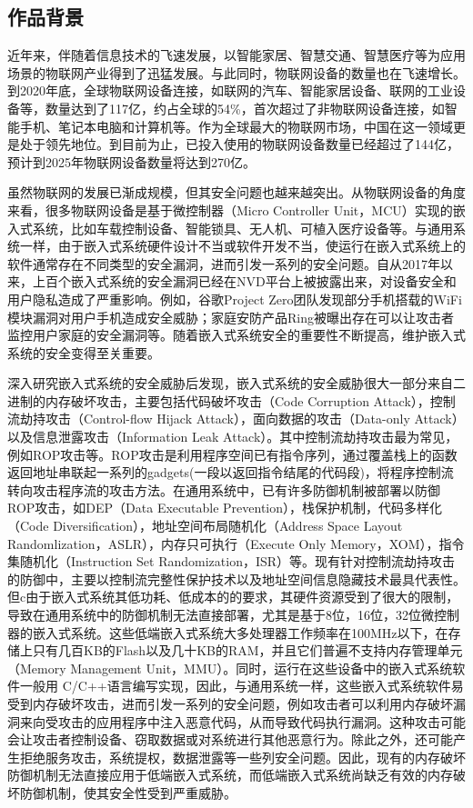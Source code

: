 \documentclass[UTF8,12pt,a4paper]{ctexart}
\numberwithin{figure}{section}
\begin{document}
\subsection{作品背景}
\par 近年来，伴随着信息技术的飞速发展，以智能家居、智慧交通、智慧医疗等为应用场景的物联网产业得到了迅猛发展。与此同时，物联网设备的数量也在飞速增长。到2020年底，全球物联网设备连接，如联网的汽车、智能家居设备、联网的工业设备等，数量达到了117亿，约占全球的54\%，首次超过了非物联网设备连接，如智能手机、笔记本电脑和计算机等。作为全球最大的物联网市场，中国在这一领域更是处于领先地位。到目前为止，已投入使用的物联网设备数量已经超过了144亿，预计到2025年物联网设备数量将达到270亿\cite{StateOfIOT}。
\par 虽然物联网的发展已渐成规模，但其安全问题也越来越突出。从物联网设备的角度来看，很多物联网设备是基于微控制器（Micro Controller Unit，MCU）实现的嵌入式系统，比如车载控制设备、智能锁具、无人机、可植入医疗设备等。与通用系统一样，由于嵌入式系统硬件设计不当或软件开发不当，使运行在嵌入式系统上的软件通常存在不同类型的安全漏洞，进而引发一系列的安全问题。自从2017年以来，上百个嵌入式系统的安全漏洞已经在NVD平台上被披露出来，对设备安全和用户隐私造成了严重影响。例如，谷歌Project Zero团队发现部分手机搭载的WiFi模块漏洞对用户手机造成安全威胁\cite{beniamini2017project}；家庭安防产品Ring被曝出存在可以让攻击者监控用户家庭的安全漏洞等\cite{Amazon}。随着嵌入式系统安全的重要性不断提高，维护嵌入式系统的安全变得至关重要。
\par 深入研究嵌入式系统的安全威胁后发现，嵌入式系统的安全威胁很大一部分来自二进制的内存破坏攻击，主要包括代码破坏攻击（Code Corruption Attack），控制流劫持攻击（Control-flow Hijack Attack），面向数据的攻击（Data-only Attack）以及信息泄露攻击（Information Leak Attack）\cite{clements2017protecting,papp2015embedded}。其中控制流劫持攻击最为常见，例如ROP攻击等。ROP攻击是利用程序空间已有指令序列，通过覆盖栈上的函数返回地址串联起一系列的gadgets(一段以返回指令结尾的代码段)，将程序控制流转向攻击程序流的攻击方法。在通用系统中\cite{cowan1998stackguard,angelfire,tanenbaum1997operating,bojinov2011address,backes2014you}，已有许多防御机制被部署以防御ROP攻击，如DEP（Data Executable Prevention），栈保护机制，代码多样化（Code Diversification），地址空间布局随机化（Address Space Layout Randomlization，ASLR），内存只可执行（Execute Only Memory，XOM），指令集随机化（Instruction Set Randomization，ISR）等。现有针对控制流劫持攻击的防御中，主要以控制流完整性保护技术以及地址空间信息隐藏技术最具代表性。但c由于嵌入式系统其低功耗、低成本的的要求，其硬件资源受到了很大的限制，导致在通用系统中的防御机制无法直接部署，尤其是基于8位，16位，32位微控制器的嵌入式系统\cite{PositionPaper}。这些低端嵌入式系统大多处理器工作频率在100MHz以下，在存储上只有几百KB的Flash以及几十KB的RAM，并且它们普遍不支持内存管理单元（Memory Management Unit，MMU）\cite{abbasi2019challenges,almakhdhub2020mu}。同时，运行在这些设备中的嵌入式系统软件一般用 C/C++语言编写实现，因此，与通用系统一样，这些嵌入式系统软件易受到内存破坏攻击，进而引发一系列的安全问题\cite{roemer2012return}，例如攻击者可以利用内存破坏漏洞来向受攻击的应用程序中注入恶意代码，从而导致代码执行漏洞。这种攻击可能会让攻击者控制设备、窃取数据或对系统进行其他恶意行为。除此之外，还可能产生拒绝服务攻击，系统提权，数据泄露等一些列安全问题。因此，现有的内存破坏防御机制无法直接应用于低端嵌入式系统，而低端嵌入式系统尚缺乏有效的内存破坏防御机制，使其安全性受到严重威胁。
\end{document}
